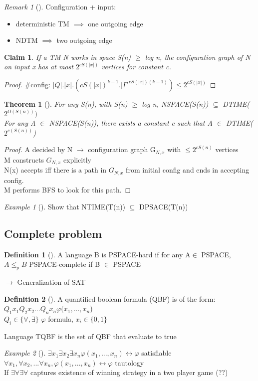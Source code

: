 \documentclass{article}
\newtheorem{claim}{Claim}
\newtheorem{theorem}{Theorem}
\theoremstyle{definition}
\newtheorem{definition}{Definition}
\theoremstyle{remark}
\newtheorem*{remark}{Remark}
\newtheorem*{example}{Example}
\newcommand{\Thm}[3]{\begin{theorem}[#1]\label{#2}#3\end{theorem}}
\newcommand{\Ex}[3]{\begin{example}[#1]\label{#2}#3\end{example}}
\newcommand{\Def}[3]{\begin{definition}[#1]\label{#2}#3\end{definition}}
\newcommand{\Rem}[3]{\begin{remark}[#1]\label{#2}#3\end{remark}}
\newcommand{\Proof}[1]{\begin{proof}#1\end{proof}}
\begin{document}
\Rem{}{}{Configuration + input:\begin{itemize}
		\item deterministic TM $\implies$ one outgoing edge
		\item NDTM $\implies$ two outgoing edge
	\end{itemize}}
	
\begin{claim}
	If a TM N works in space S(n) $\geq$ log n, the configuration graph of N on input x has at most $2^{cS(|x|)}$ vertices for constant c.
\end{claim}

\Proof{\#config: $|Q|.|x|.(cS(|x|)^{k-1}.|\Gamma|^{cS(|x|)(k-1)}) \leq 2^{cS(|x|)}$}
	
\Thm{}{}{For any S(n), with S(n) $\geq$ log n, NSPACE(S(n)) $\subseteq$ DTIME($2^{O(S(n))})$\\
	For any A $\in$ NSPACE(S(n)), there exists a constant c such that A $\in$ DTIME($2^{c(S(n))}$)}

\Proof{A decided by N $\rightarrow$ configuration graph G$_{N,x}$ with $\leq 2^{cS(n)}$ vertices\\
	M constructs $G_{N,x}$ explicitly\\
	N(x) accepts iff there is a path in $G_{N,x}$ from initial config and ends in accepting config.\\
	M performs BFS to look for this path.}

\Ex{}{}{Show that NTIME(T(n)) $\subseteq$ DPSACE(T(n)) }

\subsection{Complete problem}
\Def{}{}{A language B is PSPACE-hard if for any A$\in$ PSPACE, $A \leq_p B$ PSPACE-complete if B $\in$ PSPACE}
$\rightarrow$ Generalization of SAT
\Def{}{}{A quantified boolean formula (QBF) is of the form: $Q_1x_1Q_2x_2...Q_nx_n\varphi(x_1,...,x_n$)\\
$Q_i \in \{\forall,\exists\}$ $\varphi$ formula, $x_i \in \{0,1\}$}
Language TQBF is the set of QBF that evaluate to true

\Ex{}{}{$\exists x_1\exists x_2\exists x_n \varphi(x_1,...,x_n) \leftrightarrow \varphi$ satisfiable\\
	$\forall x_1,\forall x_2,...\forall x_n, \varphi(x_1,...,x_n) \leftrightarrow \varphi$ tautology\\
	
	If $\exists\forall\exists\forall$ captures existence of winning strategy in a two player game (??)}
\end{document}
